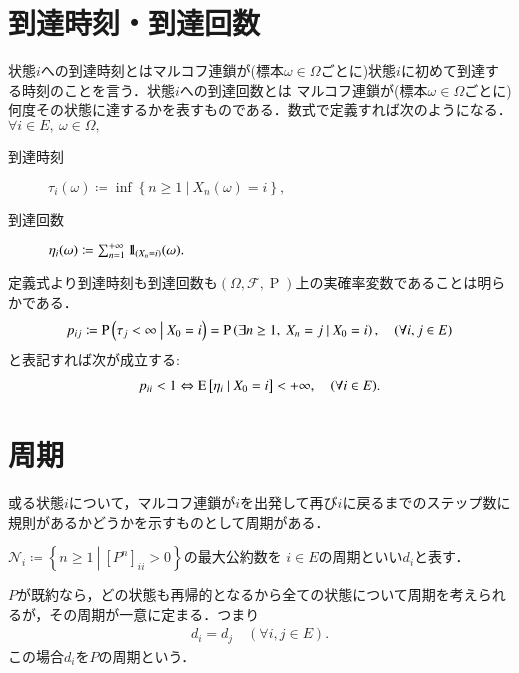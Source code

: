 \section{到達時刻・到達回数}
	\begin{dfn}[到達時刻と到達回数]
		状態$i$への到達時刻とはマルコフ連鎖が(標本$\omega \in \Omega$ごとに)状態$i$に初めて到達する時刻のことを言う．状態$i$への到達回数とは
		マルコフ連鎖が(標本$\omega \in \Omega$ごとに)何度その状態に達するかを表すものである．数式で定義すれば次のようになる．
		$\forall i \in E,\ \omega \in \Omega,$
		\begin{description}
			\item[到達時刻] $\tau_i(\omega) \coloneqq \inf{}{\left\{ n \geq 1\ \left|\ X_n(\omega) = i \right.\right\}},$
			\item[到達回数] $\eta_i(\omega) \coloneqq \sum_{n=1}^{+\infty} \mbox{1}\hspace{-0.25em}\mbox{l}_{(X_n = i)}(\omega).$
		\end{description}
	\end{dfn}
	定義式より到達時刻も到達回数も$(\Omega,\mathcal{F},\operatorname{P})$上の実確率変数であることは明らかである．
	\begin{align}
		p_{ij} \coloneqq \operatorname{P} \left( \tau_j < \infty \ \middle|\ X_0 = i \right) = \operatorname{P} \left( \exists n \geq 1,\ X_n = j \ \middle|\ X_0 = i \right), \quad (\forall i,j \in E)
	\end{align}
	と表記すれば次が成立する:
	\begin{align}
		p_{ii} < 1 \Leftrightarrow \operatorname{E} \left[ \eta_i \ \middle|\ X_0 = i \right] < +\infty, \quad (\forall i \in E).
	\end{align}

\section{周期}
	或る状態$i$について，マルコフ連鎖が$i$を出発して再び$i$に戻るまでのステップ数に規則があるかどうかを示すものとして周期がある．
	\begin{dfn}[状態の周期]
		$\mathcal{N}_i \coloneqq \left\{n \geq 1\ \left|\ [P^n]_{ii} > 0 \right.\right\}$の最大公約数を
		$i \in E$の周期といい$d_i$と表す．
	\end{dfn}
	
	\begin{prp}[既約なら周期は状態に依らない]
		$P$が既約なら，どの状態も再帰的となるから全ての状態について周期を考えられるが，その周期が一意に定まる．つまり
		\begin{align}
			d_i = d_j \quad (\forall i,j \in E).
		\end{align}
		この場合$d_i$を$P$の周期という．
	\end{prp}
	
